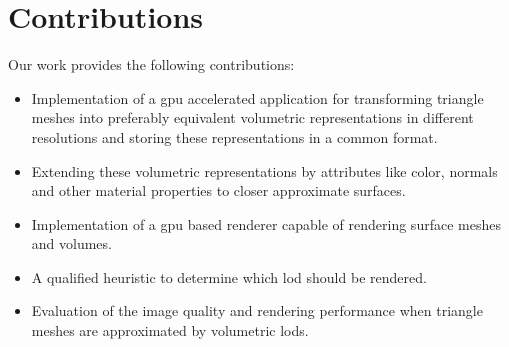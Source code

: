 \section{Contributions}
Our work provides the following contributions:
\begin{itemize}
    \item Implementation of a \ac{gpu} accelerated application for transforming triangle meshes into preferably equivalent volumetric representations in different resolutions and storing these representations in a common format.
    \item Extending these volumetric representations by attributes like color, normals and other material properties to closer approximate surfaces.
    \item Implementation of a \ac{gpu} based renderer capable of rendering surface meshes and volumes.
    \item A qualified heuristic to determine which \ac{lod} should be rendered.
    \item Evaluation of the image quality and rendering performance when triangle meshes are approximated by volumetric \acsp{lod}.
\end{itemize}
